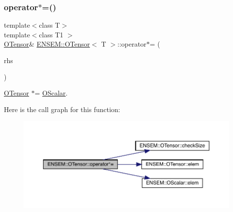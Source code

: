 \subsubsection{\texorpdfstring{operator$\ast$=()}{operator*=()}\hspace{0.1cm}{\footnotesize\ttfamily [2/4]}}
{\footnotesize\ttfamily template$<$class T$>$ \\
template$<$class T1 $>$ \\
\mbox{\hyperlink{classENSEM_1_1OTensor}{O\+Tensor}}\& \mbox{\hyperlink{classENSEM_1_1OTensor}{E\+N\+S\+E\+M\+::\+O\+Tensor}}$<$ T $>$\+::operator$\ast$= (\begin{DoxyParamCaption}\item[{const \mbox{\hyperlink{classENSEM_1_1OScalar}{O\+Scalar}}$<$ T1 $>$ \&}]{rhs }\end{DoxyParamCaption})\hspace{0.3cm}{\ttfamily [inline]}}



\mbox{\hyperlink{classENSEM_1_1OTensor}{O\+Tensor}} $\ast$= \mbox{\hyperlink{classENSEM_1_1OScalar}{O\+Scalar}}. 

Here is the call graph for this function\+:
\nopagebreak
\begin{figure}[H]
\begin{center}
\leavevmode
\includegraphics[width=350pt]{da/d8a/classENSEM_1_1OTensor_a0326883980545068700bbdd762df5904_cgraph}
\end{center}
\end{figure}
\mbox{\label{classENSEM_1_1OTensor_a6edba72b265fa3629417ad85c9ae1477}} 
